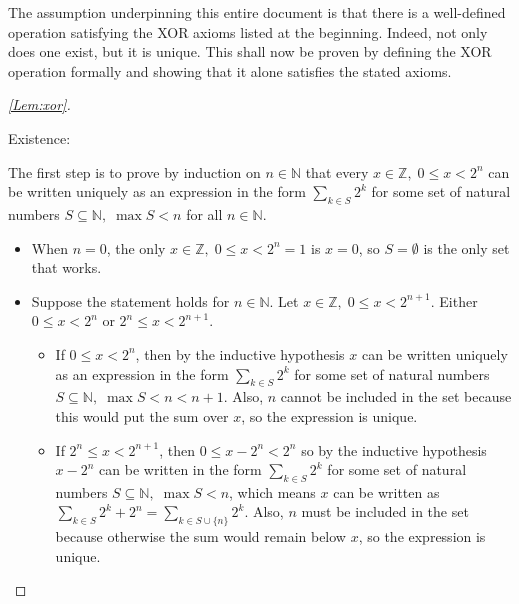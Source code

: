 \documentclass[1gpt]{article}
\makeatletter
\theoremstyle{break}
\theoremstyle{nonumberbreak}
\newtheorem{proof}{Proof}
\newenvironment{Prf}[1]{\begin{proof}[\ref{Lem:#1}]\makeatletter\def\@currentlabel{proof}\makeatother\label{Prf:#1}}{\end{proof}}
\newcommand{\NN}{\mathbb{N}}
\newcommand{\ZZ}{\mathbb{Z}}
\makeatother
\begin{document}
The assumption underpinning this entire document is that there is a well-defined operation satisfying the XOR axioms listed at the beginning. Indeed, not only does one exist, but it is unique. This shall now be proven by defining the XOR operation formally and showing that it alone satisfies the stated axioms.

\begin{Prf}{xor}

    Existence:

    The first step is to prove by induction on $n \in \NN$ that every $x \in \ZZ,\; 0 \leq x < 2^n$ can be written uniquely as an expression in the form $\sum_{k \in S} 2^k$ for some set of natural numbers $S \subseteq \NN,\; \max S < n$ for all $n \in \NN$.

    \begin{itemize}

        \item
            When $n = 0$, the only $x \in \ZZ,\; 0 \leq x < 2^n = 1$ is $x = 0$, so $S = \emptyset$ is the only set that works.

        \item
            Suppose the statement holds for $n \in \NN$. Let $x \in \ZZ,\; 0 \leq x < 2^{n+1}$. Either $0 \leq x < 2^n$ or $2^n \leq x < 2^{n+1}$.

            \begin{itemize}

                \item
                    If $0 \leq x < 2^n$, then by the inductive hypothesis $x$ can be written uniquely as an expression in the form $\sum_{k \in S} 2^k$ for some set of natural numbers $S \subseteq \NN,\; \max S < n < n + 1$. Also, $n$ cannot be included in the set because this would put the sum over $x$, so the expression is unique.

                \item
                    If $2^n \leq x < 2^{n+1}$, then $0 \leq x-2^n < 2^n$ so by the inductive hypothesis $x-2^n$ can be written in the form $\sum_{k \in S} 2^k$ for some set of natural numbers $S \subseteq \NN,\; \max S < n$, which means $x$ can be written as $\sum_{k \in S} 2^k + 2^n = \sum_{k \in S \cup \{n\}} 2^k$. Also, $n$ must be included in the set because otherwise the sum would remain below $x$, so the expression is unique.

            \end{itemize}

    \end{itemize}


\end{Prf}
\end{document}
